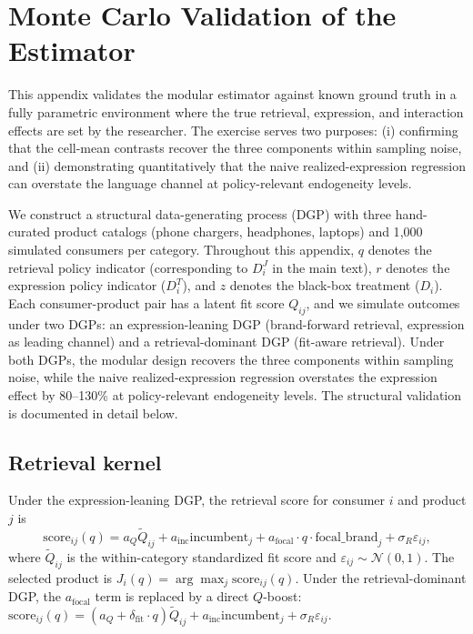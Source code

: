 \documentclass[11pt]{article}
\newcommand{\J}{J}
\newcommand{\Q}{Q}
\begin{document}
\section{Monte Carlo Validation of the Estimator}\label{section:dgp}

This appendix validates the modular estimator against known ground truth in a fully parametric environment where the true retrieval, expression, and interaction effects are set by the researcher. The exercise serves two purposes: (i) confirming that the cell-mean contrasts recover the three components within sampling noise, and (ii) demonstrating quantitatively that the naive realized-expression regression can overstate the language channel at policy-relevant endogeneity levels.

We construct a structural data-generating process (DGP) with three hand-curated product catalogs (phone chargers, headphones, laptops) and 1{,}000 simulated consumers per category. Throughout this appendix, $q$ denotes the retrieval policy indicator (corresponding to $D_i^J$ in the main text), $r$ denotes the expression policy indicator ($D_i^T$), and $z$ denotes the black-box treatment ($D_i$). Each consumer-product pair has a latent fit score $\Q_{ij}$, and we simulate outcomes under two DGPs: an expression-leaning DGP (brand-forward retrieval, expression as leading channel) and a retrieval-dominant DGP (fit-aware retrieval). Under both DGPs, the modular design recovers the three components within sampling noise, while the naive realized-expression regression overstates the expression effect by 80--130\% at policy-relevant endogeneity levels. The structural validation is documented in detail below.

\subsection{Retrieval kernel}

Under the expression-leaning DGP, the retrieval score for consumer $i$ and product $j$ is
\[
\mathrm{score}_{ij}(q) = a_Q \tilde{\Q}_{ij} + a_{\mathrm{inc}} \mathrm{incumbent}_j + a_{\mathrm{focal}} \cdot q \cdot \mathrm{focal\_brand}_j + \sigma_R \varepsilon_{ij},
\]
where $\tilde{\Q}_{ij}$ is the within-category standardized fit score and $\varepsilon_{ij} \sim \mathcal{N}(0, 1)$. The selected product is $\J_i(q) = \arg\max_{j} \mathrm{score}_{ij}(q)$. Under the retrieval-dominant DGP, the $a_{\mathrm{focal}}$ term is replaced by a direct $Q$-boost: $\mathrm{score}_{ij}(q) = (a_Q + \delta_{\mathrm{fit}} \cdot q) \tilde{\Q}_{ij} + a_{\mathrm{inc}} \mathrm{incumbent}_j + \sigma_R \varepsilon_{ij}$.
\end{document}
